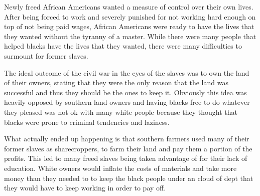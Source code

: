 Newly freed African Americans wanted a measure of control over their own lives.
After being forced to work and severely punished for not working hard enough on top of not being paid wages, African Americans were ready to have the lives that they wanted without the tyranny of a master.
While there were many people that helped blacks have the lives that they wanted, there were many difficulties to surmount for former slaves.

The ideal outcome of the civil war in the eyes of the slaves was to own the land of their owners, stating that they were the only reason that the land was successful and thus they should be the ones to keep it.
Obviously this idea was heavily opposed by southern land owners and having blacks free to do whatever they pleased was not ok with many white people because they thought that blacks were prone to criminal tendencies and laziness.

What actually ended up happening is that southern farmers used many of their former slaves as sharecroppers, to farm their land and pay them a portion of the profits.
This led to many freed slaves being taken advantage of for their lack of education.
White owners would inflate the costs of materials and take more money than they needed to to keep the black people under an cloud of dept that they would have to keep working in order to pay off.